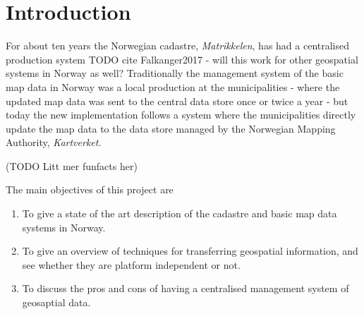 \chapter{Introduction}
For about ten years the Norwegian cadastre, \textit{Matrikkelen}, has had a centralised production system TODO cite Falkanger2017 - will this work for other geospatial systems in Norway as well? Traditionally the management system of the basic map data in Norway was a local production at the municipalities - where the updated map data was sent to the central data store once or twice a year - but today the new implementation follows a system where the municipalities directly update the map data to the data store managed by the Norwegian Mapping Authority, \textit{Kartverket}. 

(TODO Litt mer funfacts her)



The main objectives of this project are
\begin{enumerate}
\item To give a state of the art description of the cadastre and basic map data systems in Norway.
\item To give an overview of techniques for transferring geospatial information, and see whether they are platform independent or not.
\item To discuss the pros and cons of having a centralised management system of geosaptial data.
\end{enumerate}



